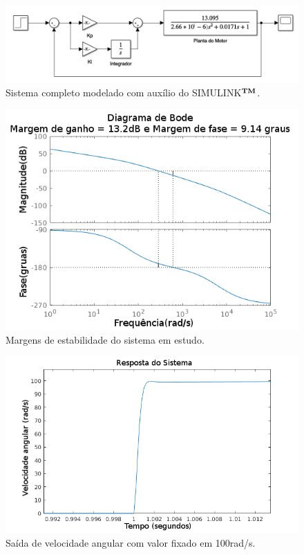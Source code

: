 \documentclass[10pt,fleqn,a4paper]{article}
\begin{document}
    \begin{figure}[ht]
    	\begin{center}
    		\includegraphics[angle=0, scale=0.4]{images/sistemaEControlador}
    	\end{center}
    	\caption{Sistema completo modelado com auxílio do SIMULINK$^{\small{\textbf{TM}}}$.}
    	\label{fig:sistemasimulink}
    \end{figure}

	\begin{figure}[ht]
		\begin{center}
			\includegraphics[angle=0, scale=0.8]{images/margins_review}
		\end{center}
		\caption{Margens de estabilidade do sistema em estudo.}
		\label{fig:margin}
	\end{figure}

	\begin{figure}[ht]
		\begin{center}
			\includegraphics[angle=0, scale=0.6]{images/sistemStep_review}
		\end{center}
		\caption{Saída de velocidade angular com valor fixado em 100rad/s.}
		\label{fig:saidasimulada}
	\end{figure}
    
\end{document}
